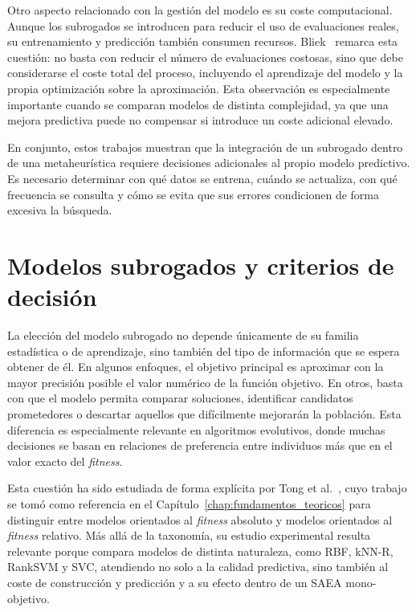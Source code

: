 Otro aspecto relacionado con la gestión del modelo es su coste computacional.
Aunque los subrogados se introducen para reducir el uso de evaluaciones reales,
su entrenamiento y predicción también consumen recursos.
Bliek~\cite{bliek2022sustainableSBO} remarca esta cuestión: no basta con
reducir el número de evaluaciones costosas, sino que debe considerarse el coste
total del proceso, incluyendo el aprendizaje del modelo y la propia
optimización sobre la aproximación. Esta observación es especialmente
importante cuando se comparan modelos de distinta complejidad, ya que una
mejora predictiva puede no compensar si introduce un coste adicional elevado.

En conjunto, estos trabajos muestran que la integración de un subrogado dentro
de una metaheurística requiere decisiones adicionales al propio modelo
predictivo. Es necesario determinar con qué datos se entrena, cuándo se
actualiza, con qué frecuencia se consulta y cómo se evita que sus errores
condicionen de forma excesiva la búsqueda.

\section{Modelos subrogados y criterios de decisión}
\label{sec:estado_modelos_informacion}

La elección del modelo subrogado no depende únicamente de su familia
estadística o de aprendizaje, sino también del tipo de información que se
espera obtener de él. En algunos enfoques, el objetivo principal es aproximar
con la mayor precisión posible el valor numérico de la función objetivo. En
otros, basta con que el modelo permita comparar soluciones, identificar
candidatos prometedores o descartar aquellos que difícilmente mejorarán la
población. Esta diferencia es especialmente relevante en algoritmos
evolutivos, donde muchas decisiones se basan en relaciones de preferencia
entre individuos más que en el valor exacto del \textit{fitness}.


Esta cuestión ha sido estudiada de forma explícita por Tong et
al.~\cite{tong2021surrogate}, cuyo trabajo se tomó como referencia en el
Capítulo~\ref{chap:fundamentos_teoricos} para distinguir entre modelos
orientados al \textit{fitness} absoluto y modelos orientados al
\textit{fitness} relativo. Más allá de la taxonomía, su estudio experimental
resulta relevante porque compara modelos de distinta naturaleza, como RBF,
kNN-R, RankSVM y SVC, atendiendo no solo a la calidad predictiva, sino también
al coste de construcción y predicción y a su efecto dentro de un SAEA
mono-objetivo.

